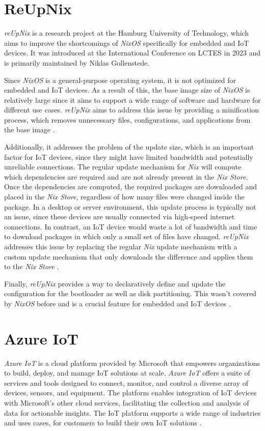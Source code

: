 \section{ReUpNix}
\textit{reUpNix} is a research project at the Hamburg University of Technology,
which aims to improve the shortcomings of \textit{NixOS} specifically for
embedded and \ac{IoT} devices. It was introduced at the International Conference on
\ac{LCTES} in 2023 and is primarily maintained by Niklas Gollenstede.

Since \textit{NixOS} is a general-purpose operating system, it is not optimized
for embedded and \ac{IoT} devices. As a result of this, the base image size of
\textit{NixOS} is relatively large since it aims to support a wide range of
software and hardware for different use cases. \textit{reUpNix} aims to address
this issue by providing a minification process, which removes unnecessary
files, configurations, and applications from the base image \cite{gollenstede:23:lctes}.

Additionally, it addresses the problem of the update size, which is an important
factor for \ac{IoT} devices, since they might have limited bandwidth and
potentially unreliable connections. The regular update mechanism for \textit{Nix}
will compute which dependencies are required and are not already present in the \textit{Nix Store}.
Once the dependencies are computed, the required packages are downloaded and
placed in the \textit{Nix Store}, regardless of how many files were changed inside
the package. In a desktop or server environment, this
update process is typically not an issue, since these devices are usually
connected via high-speed internet connections. In contrast, an \ac{IoT} device
would waste a lot of bandwidth and time to download packages in which only a
small set of files have changed. \textit{reUpNix} addresses this issue by
replacing the regular \textit{Nix} update mechanism with a custom update mechanism
that only downloads the difference and applies them to the \textit{Nix Store}
\cite{gollenstede:23:lctes}.

Finally, \textit{reUpNix} provides a way to declaratively define and update
the configuration for the bootloader as well as disk partitioning. This wasn't
covered by \textit{NixOS} before and is a crucial feature for embedded and
\ac{IoT} devices \cite{gollenstede:23:lctes}.

\section{Azure IoT}
\textit{Azure IoT} is a cloud platform provided by Microsoft that
empowers organizations to build, deploy, and manage \ac{IoT} solutions at scale.
\textit{Azure IoT} offers a suite of services and tools designed to connect,
monitor, and control a diverse array of devices, sensors, and equipment. The
platform enables integration of \ac{IoT} devices with Microsoft's other cloud
services, facilitating the collection and analysis of data for actionable insights.
The \ac{IoT} platform supports a wide range of industries and uses cases,
for customers to build their own \ac{IoT} solutions \cite{msdoc-aziot}.

